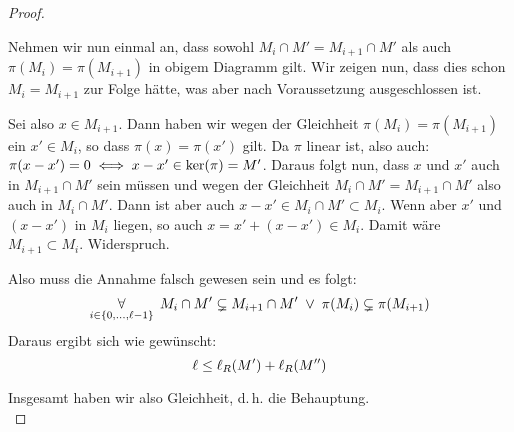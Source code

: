 \begin{proof}
\begin{description}
            Nehmen wir nun einmal an, dass sowohl $M_i\cap M' = M_{i+1}\cap M'$
            als auch $\pi(M_i) = \pi(M_{i+1})$ in obigem Diagramm gilt.
            Wir zeigen nun, dass dies schon $M_i = M_{i+1}$ zur Folge hätte, was
            aber nach Voraussetzung ausgeschlossen ist.
            
            Sei also $x\in M_{i+1}$. Dann haben wir wegen der Gleichheit
            $\pi(M_i) = \pi(M_{i+1})$ ein $x'\in M_i$, so dass $\pi(x) =
            \pi(x')$ gilt. Da $\pi$ linear ist, also auch: $\pi(x-x') = 0 \iff
            x-x' \in \operatorname{ker}(\pi) = M'$. Daraus folgt nun, dass $x$ und $x'$ auch
            in $M_{i+1}\cap M'$ sein müssen und wegen der Gleichheit 
            $M_i\cap M' = M_{i+1}\cap M'$ also auch in $M_i \cap M'$. Dann ist
            aber auch $x-x' \in M_i\cap M' \subset M_i$. Wenn aber $x'$ und
            $(x-x')$ in $M_i$ liegen, so auch $x = x' + (x-x') \in M_i$.
            Damit wäre $M_{i+1} \subset M_i$. Widerspruch.
            
            Also muss die Annahme falsch gewesen sein und es folgt:
            \[ \operatorname*{\forall}_{i\in\{0,\ldots,\ell-1\}} \;
                M_i\cap M' \subsetneq M_{i+1}\cap M'  \;\vee\;
                \pi(M_i)   \subsetneq \pi(M_{i+1})  \]
            Daraus ergibt sich wie gewünscht:
            \[ \ell \leq \operatorname{\ell}_{R}(M') + \operatorname{\ell}_{R}(M'') \]
    \end{description}
    Insgesamt haben wir also Gleichheit, d.\,h. die Behauptung.
    \\
\end{proof}








